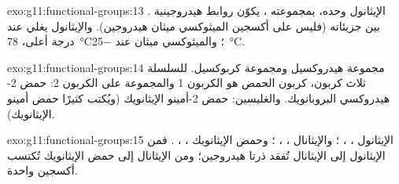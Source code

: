 \begin{solution}{exo:g11:functional-groups:13}
. الإيثانول وحده، بمجموعته ، يكوّن روابط هيدروجينية
بين جزيئاته (فليس على أكسجين الميثوكسي ميثان هيدروجين).
والإيثانول يغلي عند درجة أعلى، \qty{78}{\celsius}؛ والميثوكسي ميثان عند
\qty{-25}{\celsius}.
\end{solution}

\begin{solution}{exo:g11:functional-groups:14}
مجموعة هيدروكسيل ومجموعة كربوكسيل. للسلسلة ثلاث  كربون، كربون الحمض هو
الكربون 1 والمجموعة  على الكربون 2:
حمض 2-هيدروكسي البروبانويك. والغليسين: حمض 2-أمينو الإيثانويك (ويُكتب كثيرًا
حمض أمينو الإيثانويك).
\end{solution}

\begin{solution}{exo:g11:functional-groups:15}
الإيثانول ، ، ؛ والإيثانال ،
، ؛ وحمض الإيثانويك ، ،
. فمن الإيثانول إلى الإيثانال تُفقد ذرتا هيدروجين؛
ومن الإيثانال إلى حمض الإيثانويك تُكتسب  أكسجين واحدة.
\end{solution}

